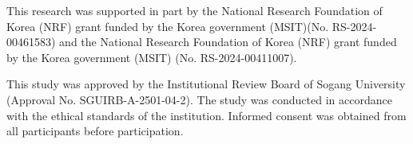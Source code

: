 \documentclass[pdflatex,iicol,sn-mathphys-ay]{sn-jnl}
\begin{document}

\maketitle









This research was supported in part by the National Research Foundation of Korea (NRF) grant funded by the Korea government (MSIT)(No. RS-2024-00461583) and the National Research Foundation of Korea (NRF) grant funded by the Korea government (MSIT) (No. RS-2024-00411007).

This study was approved by the Institutional Review Board of Sogang University (Approval No. SGUIRB-A-2501-04-2). The study was conducted in accordance with the ethical standards of the institution. Informed consent was obtained from all participants before participation.

% 


\begin{appendices}
\onecolumn



\end{appendices}
\end{document}
